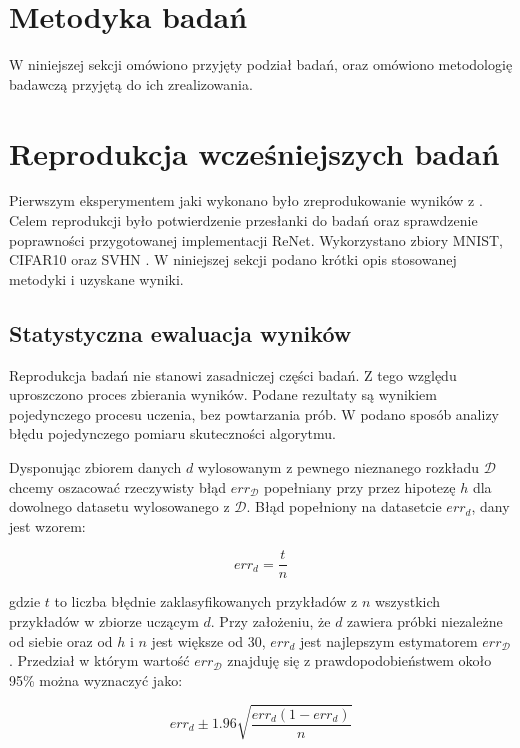 \documentclass[oneside, mag]{mgr}
\begin{document}
\section{Metodyka badań}
W niniejszej sekcji omówiono przyjęty podział badań, oraz omówiono metodologię badawczą przyjętą do ich zrealizowania.

\section{Reprodukcja wcześniejszych badań}

Pierwszym eksperymentem jaki wykonano było zreprodukowanie wyników z \cite{DBLP:journals/corr/VisinKCMCB15}. Celem reprodukcji było potwierdzenie przesłanki do badań oraz sprawdzenie poprawności przygotowanej implementacji ReNet. Wykorzystano zbiory MNIST, CIFAR10 oraz SVHN \cite{svhn}. W niniejszej sekcji podano krótki opis stosowanej metodyki i uzyskane wyniki.

\subsection{Statystyczna ewaluacja wyników}

Reprodukcja badań nie stanowi zasadniczej części badań. Z tego względu uproszczono proces zbierania wyników. Podane rezultaty są wynikiem pojedynczego procesu uczenia, bez powtarzania prób. W \cite{tom-mitchell-machine-learning} podano sposób analizy błędu pojedynczego pomiaru skuteczności algorytmu.

Dysponując zbiorem danych $d$ wylosowanym z pewnego nieznanego rozkładu $\mathcal{D}$ chcemy oszacować rzeczywisty błąd $err_{\mathcal{D}}$ popełniany przy przez hipotezę $h$ dla dowolnego datasetu wylosowanego z $\mathcal{D}$. Błąd popełniony na datasetcie $err_d$, dany jest wzorem:

\begin{equation}
	err_d = \frac{t}{n}
\end{equation}

gdzie $t$ to liczba błędnie zaklasyfikowanych przykładów z $n$ wszystkich przykładów w zbiorze uczącym $d$.
Przy założeniu, że $d$ zawiera próbki niezależne od siebie oraz od $h$ i $n$ jest większe od 30, $err_d$ jest najlepszym estymatorem $err_{\mathcal{D}}$. Przedział w którym wartość $err_{\mathcal{D}}$ znajduję się z prawdopodobieństwem około 95\% można wyznaczyć jako:

\begin{equation}
	err_{d} \pm 1.96 \sqrt{\frac{err_{d}(1 - err_{d})}{n}} 
\end{equation}
\end{document}
